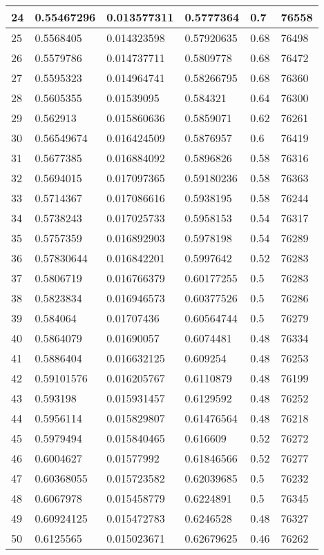 \begin{longtable}{|l|l|l|l|l|l|}
24 & 0.55467296 & 0.013577311 & 0.5777364 & 0.7 & 76558 \\ \hline 
25 & 0.5568405 & 0.014323598 & 0.57920635 & 0.68 & 76498 \\ \hline 
26 & 0.5579786 & 0.014737711 & 0.5809778 & 0.68 & 76472 \\ \hline 
27 & 0.5595323 & 0.014964741 & 0.58266795 & 0.68 & 76360 \\ \hline 
28 & 0.5605355 & 0.01539095 & 0.584321 & 0.64 & 76300 \\ \hline 
29 & 0.562913 & 0.015860636 & 0.5859071 & 0.62 & 76261 \\ \hline 
30 & 0.56549674 & 0.016424509 & 0.5876957 & 0.6 & 76419 \\ \hline 
31 & 0.5677385 & 0.016884092 & 0.5896826 & 0.58 & 76316 \\ \hline 
32 & 0.5694015 & 0.017097365 & 0.59180236 & 0.58 & 76363 \\ \hline 
33 & 0.5714367 & 0.017086616 & 0.5938195 & 0.58 & 76244 \\ \hline 
34 & 0.5738243 & 0.017025733 & 0.5958153 & 0.54 & 76317 \\ \hline 
35 & 0.5757359 & 0.016892903 & 0.5978198 & 0.54 & 76289 \\ \hline 
36 & 0.57830644 & 0.016842201 & 0.5997642 & 0.52 & 76283 \\ \hline 
37 & 0.5806719 & 0.016766379 & 0.60177255 & 0.5 & 76283 \\ \hline 
38 & 0.5823834 & 0.016946573 & 0.60377526 & 0.5 & 76286 \\ \hline 
39 & 0.584064 & 0.01707436 & 0.60564744 & 0.5 & 76279 \\ \hline 
40 & 0.5864079 & 0.01690057 & 0.6074481 & 0.48 & 76334 \\ \hline 
41 & 0.5886404 & 0.016632125 & 0.609254 & 0.48 & 76253 \\ \hline 
42 & 0.59101576 & 0.016205767 & 0.6110879 & 0.48 & 76199 \\ \hline 
43 & 0.593198 & 0.015931457 & 0.6129592 & 0.48 & 76252 \\ \hline 
44 & 0.5956114 & 0.015829807 & 0.61476564 & 0.48 & 76218 \\ \hline 
45 & 0.5979494 & 0.015840465 & 0.616609 & 0.52 & 76272 \\ \hline 
46 & 0.6004627 & 0.01577992 & 0.61846566 & 0.52 & 76277 \\ \hline 
47 & 0.60368055 & 0.015723582 & 0.62039685 & 0.5 & 76232 \\ \hline 
48 & 0.6067978 & 0.015458779 & 0.6224891 & 0.5 & 76345 \\ \hline 
49 & 0.60924125 & 0.015472783 & 0.6246528 & 0.48 & 76327 \\ \hline 
50 & 0.6125565 & 0.015023671 & 0.62679625 & 0.46 & 76262 \\ \hline 
\end{longtable}